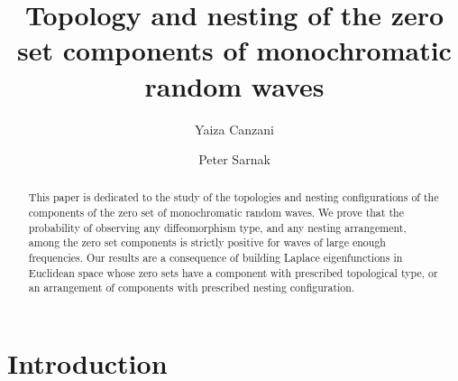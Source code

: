 \documentclass[11pt,reqno]{amsart}
\theoremstyle{definition}
\begin{document}
\title[Zero set of monochromatic random waves]{Topology and nesting of the zero set components  of  monochromatic random waves}

\begin{abstract}
This paper is dedicated to the study of the topologies and nesting configurations of the components of the zero set of monochromatic random waves. We prove that the probability of observing any diffeomorphism type, and any nesting arrangement, among the zero set components is strictly positive for waves of large enough frequencies. Our results are a consequence of building Laplace eigenfunctions in Euclidean space whose zero sets have a component with prescribed topological type, or an arrangement of components with prescribed nesting configuration.
\end{abstract}

\author[Y. Canzani]{Yaiza Canzani}
\author[P. Sarnak]{Peter Sarnak}

\address[Y. Canzani]{ University of North Carolina at Chapel Hill.\medskip}
\address[P. Sarnak]{ Institute for Advanced Study and  Princeton University.\medskip}



\maketitle


\section{Introduction}
\end{document}
